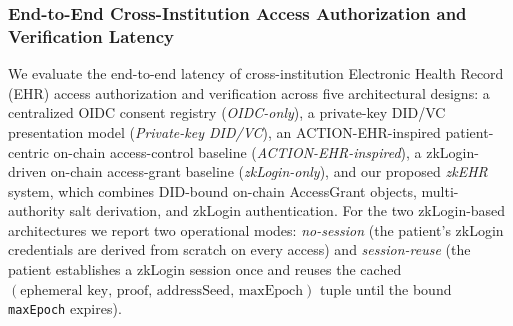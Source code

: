 %
%
%

\subsubsection{End-to-End Cross-Institution Access Authorization and Verification Latency}
\label{sec:eval-e2e-cross-institution}

We evaluate the end-to-end latency of cross-institution Electronic
Health Record (EHR) access authorization and verification across five
architectural designs: a centralized OIDC consent registry
(\textit{OIDC-only}), a private-key DID/VC presentation model
(\textit{Private-key DID/VC}), an ACTION-EHR-inspired patient-centric
on-chain access-control baseline (\textit{ACTION-EHR-inspired}), a
zkLogin-driven on-chain access-grant baseline (\textit{zkLogin-only}),
and our proposed \textit{zkEHR} system, which combines DID-bound
on-chain AccessGrant objects, multi-authority salt derivation, and
zkLogin authentication. For the two zkLogin-based architectures we
report two operational modes: \textit{no-session} (the patient's
zkLogin credentials are derived from scratch on every access) and
\textit{session-reuse} (the patient establishes a zkLogin session once
and reuses the cached
$(\text{ephemeral key},\, \text{proof},\, \text{addressSeed},\,
\text{maxEpoch})$ tuple until the bound \texttt{maxEpoch} expires).

